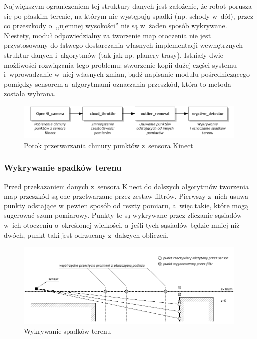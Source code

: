 Największym ograniczeniem tej struktury danych jest założenie, że robot porusza
się po płaskim terenie, na którym nie występują spadki (np. schody w~dół), przez
co przeszkody o~,,ujemnej wysokości'' nie są w~żaden sposób wykrywane. Niestety,
moduł odpowiedzialny za tworzenie map otoczenia nie jest przystosowany do
łatwego dostarczania własnych implementacji wewnętrznych struktur danych 
i~algorytmów (tak jak np. planery trasy). Istniały dwie możliwości
rozwiązania tego problemu: stworzenie kopii dużej części systemu i~wprowadzanie
w~niej własnych zmian, bądź napisanie modułu pośredniczącego pomiędzy sensorem 
a~algorytmami oznaczania przeszkód, która to metoda została wybrana.

\begin{figure}[htb!]
\centering
\includegraphics{../img/filtering}
\caption{Potok przetwarzania chmury punktów z~sensora Kinect}
\label{fig:filtering}
\end{figure}

\subsubsection{Wykrywanie spadków terenu}

Przed przekazaniem danych z~sensora Kinect do dalszych algorytmów tworzenia map
przeszkód są one przetwarzane przez zestaw filtrów. Pierwszy z~nich usuwa punkty
odstające w~pewien sposób od reszty pomiaru, a~więc takie, które mogą sugerować
szum pomiarowy. Punkty te są wykrywane przez zliczanie sąsiadów w~ich otoczeniu
o~określonej wielkości, a~jeśli tych sąsiadów będzie mniej niż dwóch, punkt taki
jest odrzucany z~dalszych obliczeń.

\begin{figure}[htb!]
\centering
\includegraphics{../../Common/img/depresion}
\caption{Wykrywanie spadków terenu}
\label{fig:depresion}
\end{figure}

